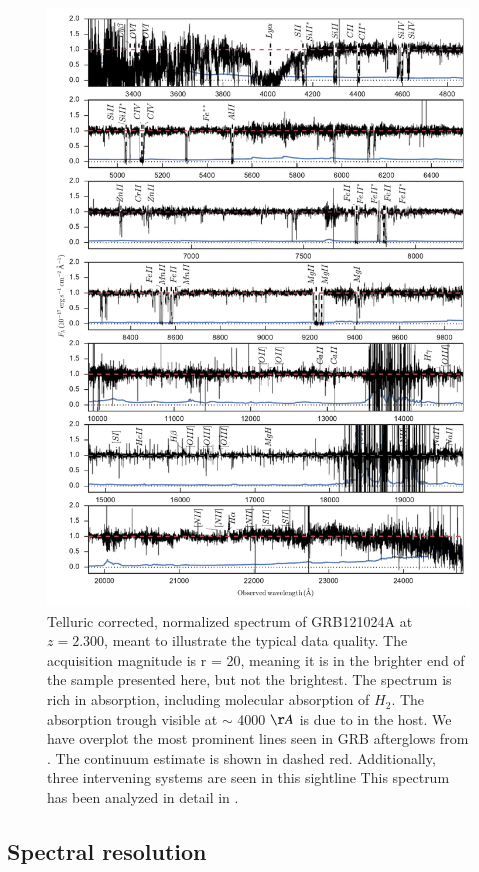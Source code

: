 \documentclass{aa}    %
\begin{document}
\begin{figure}
	\centerline{\includegraphics[width=0.85\linewidth]{figures/GRB121024A.pdf}}
	\caption{Telluric corrected, normalized spectrum of GRB121024A at $z = 2.300$,
	meant to illustrate the typical data quality. The acquisition magnitude is r =
	20, meaning it is in the brighter end of the sample presented here, but not the
	brightest. The spectrum is rich in absorption, including molecular absorption
	of $H_2$. The absorption trough visible at $\sim$ 4000 $\AA$ is due to \lya in
	the host. We have overplot the most prominent lines seen in GRB afterglows from
	\citet{Christensen2011a}. The continuum estimate is shown in dashed red.
	Additionally, three intervening systems are seen in this sightline  This
	spectrum has been analyzed in detail in \citet{Friis2015}.}
	\label{fig:spectrum}
\end{figure}


\subsection{Spectral resolution} \label{resolution}
\end{document}
